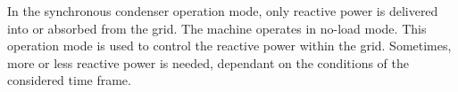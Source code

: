 
\begin{solutionblock}
    In the synchronous condenser operation mode, only reactive power is delivered into or absorbed from the grid. The machine operates in no-load mode. This operation mode is used to control the reactive power within the grid. Sometimes, more or less reactive power is needed, dependant on the conditions of the considered time frame.
\end{solutionblock}


